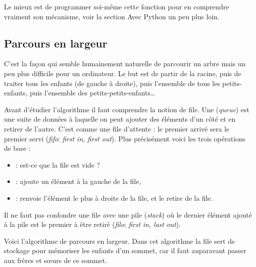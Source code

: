 \documentclass[11pt,class=report,crop=false]{standalone}
\begin{document}
Le mieux est de programmer soi-même cette fonction pour en comprendre vraiment son mécanisme, voir la section \og{}Avec Python\fg{} un peu plus loin.


\subsection{Parcours en largeur}

	
C'est la façon qui semble humainement naturelle de parcourir un arbre mais un peu plus difficile pour un ordinateur. 
Le but est de partir de la racine, puis de traiter tous les enfants (de gauche à droite), puis l'ensemble de tous les petits-enfants, puis l'ensemble des petits-petits-enfants\ldots



Avant d'étudier l'algorithme il faut comprendre la notion de \og{}file\fg{}.
Une  (\emph{queue}) est une suite de données à laquelle on peut ajouter des éléments d'un côté et en retirer de l'autre. C'est comme une file d'attente : le premier arrivé sera le premier servi (\emph{fifo}: \emph{first in, first out}).
Plus précisément voici les trois opérations de base :
\begin{itemize}
	\item {} : est-ce que la file est vide ? 
	\item {} : ajoute un élément à la gauche  de la file,
    \item {} : renvoie l'élément le plus à droite de la file, et le retire de la file.
\end{itemize}



Il ne faut pas confondre une file avec une \og{}pile\fg{} (\emph{stack}) où le dernier élément ajouté à la pile est le premier à être retiré (\emph{filo}: \emph{first in, last out}).

Voici l'algorithme de parcours en largeur. Dans cet algorithme la file sert de stockage pour mémoriser les enfants d'un sommet, car il faut auparavant passer aux frères et s\oe urs de ce sommet. 
\end{document}
